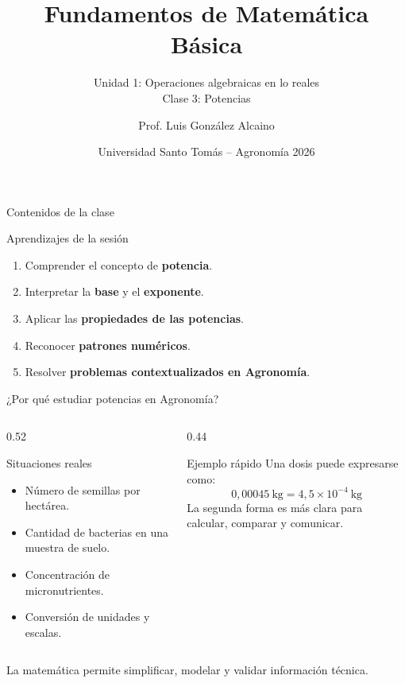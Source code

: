 \documentclass[aspectratio=169,10pt,handout]{beamer}
\title{Fundamentos de Matemática Básica}
\subtitle{Unidad 1: Operaciones algebraicas en lo reales\\ Clase 3: Potencias}
\author{Prof. Luis González Alcaino}
\date{Universidad Santo Tomás -- Agronomía 2026}
\newcommand{\destacar}[1]{\textcolor{USTBlueDark}{\textbf{#1}}}
\begin{document}
	
	\begin{frame}
		\titlepage
	\end{frame}
	
	\begin{frame}{Contenidos de la clase}
		\begin{block}{Aprendizajes de la sesión}
			\begin{enumerate}
				\item Comprender el concepto de \destacar{potencia}.
				\item Interpretar la \destacar{base} y el \destacar{exponente}.
				\item Aplicar las \destacar{propiedades de las potencias}.
				\item Reconocer \destacar{patrones numéricos}.
				\item Resolver \destacar{problemas contextualizados en Agronomía}.
			\end{enumerate}
		\end{block}
	\end{frame}
	
	
	
	\begin{frame}{¿Por qué estudiar potencias en Agronomía?}
		\begin{columns}[T,totalwidth=\textwidth]
			\begin{column}{0.52\textwidth}
				\begin{block}{Situaciones reales}
					\begin{itemize}
						\item Número de semillas por hectárea.
						\item Cantidad de bacterias en una muestra de suelo.
						\item Concentración de micronutrientes.
						\item Conversión de unidades y escalas.
					\end{itemize}
				\end{block}
			\end{column}
			
			\begin{column}{0.44\textwidth}
				\begin{exampleblock}{Ejemplo rápido}
					Una dosis puede expresarse como:
					\[
					0{,}00045\ \text{kg}=4{,}5\times10^{-4}\ \text{kg}
					\]
					La segunda forma es más clara para calcular, comparar y comunicar.
				\end{exampleblock}
			\end{column}
		\end{columns}
		
		\vspace{0.2cm}
		\centering
		{\small \textcolor{WarmGray}{La matemática permite simplificar, modelar y validar información técnica.}}
	\end{frame}
	
\end{document}

